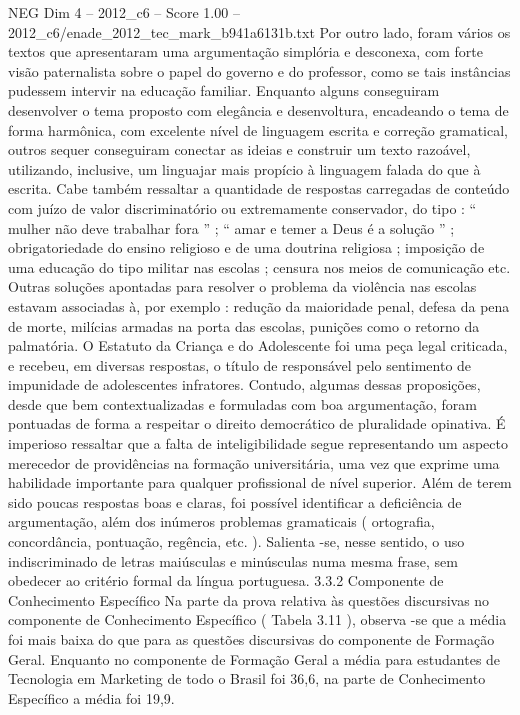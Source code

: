 \begin{textsample}{NEG Dim 4 – 2012\_c6 – Score 1.00 – 2012\_c6/enade\_2012\_tec\_mark\_b941a6131b.txt}
Por outro lado, foram vários os textos que apresentaram uma argumentação simplória e desconexa, com forte visão paternalista sobre o papel do governo e do professor, como se tais instâncias pudessem intervir na educação familiar.
Enquanto alguns conseguiram desenvolver o tema proposto com elegância e desenvoltura, encadeando o tema de forma harmônica, com excelente nível de linguagem escrita e correção gramatical, outros sequer conseguiram conectar as ideias e construir um texto razoável, utilizando, inclusive, um linguajar mais propício à linguagem falada do que à escrita.
Cabe também ressaltar a quantidade de respostas carregadas de conteúdo com juízo de valor discriminatório ou extremamente conservador, do tipo : “ mulher não deve trabalhar fora ” ; “ amar e temer a Deus é a solução ” ; obrigatoriedade do ensino religioso e de uma doutrina religiosa ; imposição de uma educação do tipo militar nas escolas ; censura nos meios de comunicação etc.
Outras soluções apontadas para resolver o problema da violência nas escolas estavam associadas à, por exemplo : redução da maioridade penal, defesa da pena de morte, milícias armadas na porta das escolas, punições como o retorno da palmatória.
O Estatuto da Criança e do Adolescente foi uma peça legal criticada, e recebeu, em diversas respostas, o título de responsável pelo sentimento de impunidade de adolescentes infratores.
Contudo, algumas dessas proposições, desde que bem contextualizadas e formuladas com boa argumentação, foram pontuadas de forma a respeitar o direito democrático de pluralidade opinativa.
É imperioso ressaltar que a falta de inteligibilidade segue representando um aspecto merecedor de providências na formação universitária, uma vez que exprime uma habilidade importante para qualquer profissional de nível superior.
Além de terem sido poucas respostas boas e claras, foi possível identificar a deficiência de argumentação, além dos inúmeros problemas gramaticais ( ortografia, concordância, pontuação, regência, etc. ).
Salienta -se, nesse sentido, o uso indiscriminado de letras maiúsculas e minúsculas numa mesma frase, sem obedecer ao critério formal da língua portuguesa. 3.3.2 Componente de Conhecimento Específico Na parte da prova relativa às questões discursivas no componente de Conhecimento Específico ( Tabela 3.11 ), observa -se que a média foi mais baixa do que para as questões discursivas do componente de Formação Geral.
Enquanto no componente de Formação Geral a média para estudantes de Tecnologia em Marketing de todo o Brasil foi 36,6, na parte de Conhecimento Específico a média foi 19,9.

\end{textsample}
